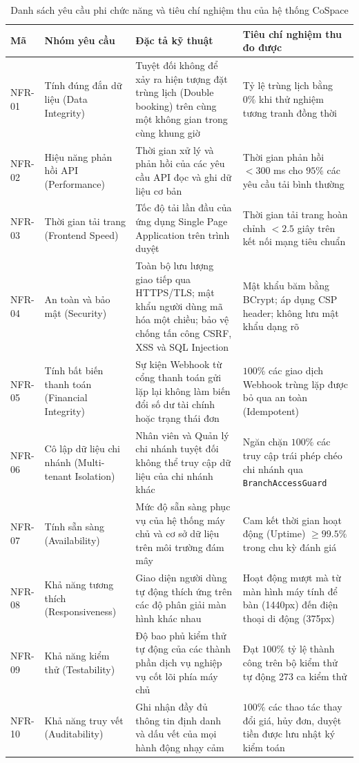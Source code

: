 \begin{table}[H]
\centering
\caption{Danh sách yêu cầu phi chức năng và tiêu chí nghiệm thu của hệ thống CoSpace}
\label{tab:nfr}
\small
\renewcommand{\arraystretch}{1.25}
\begin{tabular}{|p{1.5cm}|p{3.2cm}|p{5.5cm}|p{4.2cm}|}
\hline
\textbf{Mã} & \textbf{Nhóm yêu cầu} & \textbf{Đặc tả kỹ thuật} & \textbf{Tiêu chí nghiệm thu đo được} \\
\hline
NFR-01 & Tính đúng đắn dữ liệu (Data Integrity) & Tuyệt đối không để xảy ra hiện tượng đặt trùng lịch (Double booking) trên cùng một không gian trong cùng khung giờ & Tỷ lệ trùng lịch bằng $0\%$ khi thử nghiệm tương tranh đồng thời \\
\hline
NFR-02 & Hiệu năng phản hồi API (Performance) & Thời gian xử lý và phản hồi của các yêu cầu API đọc và ghi dữ liệu cơ bản & Thời gian phản hồi $< 300$ ms cho $95\%$ các yêu cầu tải bình thường \\
\hline
NFR-03 & Thời gian tải trang (Frontend Speed) & Tốc độ tải lần đầu của ứng dụng Single Page Application trên trình duyệt & Thời gian tải trang hoàn chỉnh $< 2.5$ giây trên kết nối mạng tiêu chuẩn \\
\hline
NFR-04 & An toàn và bảo mật (Security) & Toàn bộ lưu lượng giao tiếp qua HTTPS/TLS; mật khẩu người dùng mã hóa một chiều; bảo vệ chống tấn công CSRF, XSS và SQL Injection & Mật khẩu băm bằng BCrypt; áp dụng CSP header; không lưu mật khẩu dạng rõ \\
\hline
NFR-05 & Tính bất biến thanh toán (Financial Integrity) & Sự kiện Webhook từ cổng thanh toán gửi lặp lại không làm biến đổi số dư tài chính hoặc trạng thái đơn & $100\%$ các giao dịch Webhook trùng lặp được bỏ qua an toàn (Idempotent) \\
\hline
NFR-06 & Cô lập dữ liệu chi nhánh (Multi-tenant Isolation) & Nhân viên và Quản lý chi nhánh tuyệt đối không thể truy cập dữ liệu của chi nhánh khác & Ngăn chặn $100\%$ các truy cập trái phép chéo chi nhánh qua \texttt{BranchAccessGuard} \\
\hline
NFR-07 & Tính sẵn sàng (Availability) & Mức độ sẵn sàng phục vụ của hệ thống máy chủ và cơ sở dữ liệu trên môi trường đám mây & Cam kết thời gian hoạt động (Uptime) $\ge 99.5\%$ trong chu kỳ đánh giá \\
\hline
NFR-08 & Khả năng tương thích (Responsiveness) & Giao diện người dùng tự động thích ứng trên các độ phân giải màn hình khác nhau & Hoạt động mượt mà từ màn hình máy tính để bàn (1440px) đến điện thoại di động (375px) \\
\hline
NFR-09 & Khả năng kiểm thử (Testability) & Độ bao phủ kiểm thử tự động của các thành phần dịch vụ nghiệp vụ cốt lõi phía máy chủ & Đạt $100\%$ tỷ lệ thành công trên bộ kiểm thử tự động 273 ca kiểm thử \\
\hline
NFR-10 & Khả năng truy vết (Auditability) & Ghi nhận đầy đủ thông tin định danh và dấu vết của mọi hành động nhạy cảm & $100\%$ các thao tác thay đổi giá, hủy đơn, duyệt tiền được lưu nhật ký kiểm toán \\
\hline
\end{tabular}
\end{table}

